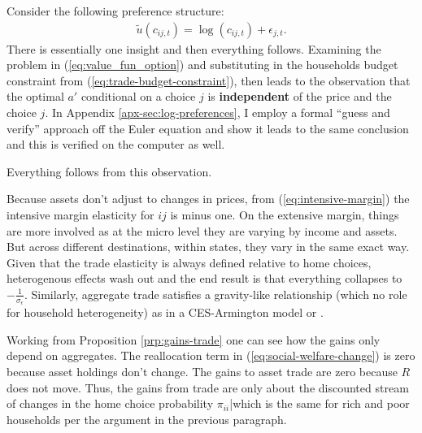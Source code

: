 \documentclass[12pt,pdftex]{article}
\begin{document}
\begin{onehalfspacing}
Consider the following preference structure:
\begin{align}
\tilde{u}( c_{ij,t} ) =  \log(c_{ij,t}) + \epsilon_{j,t}. \nonumber
\end{align}
There is essentially one insight and then everything follows. Examining the problem in (\ref{eq:value_fun_option}) and substituting in the households budget constraint from (\ref{eq:trade-budget-constraint}), then leads to the observation that the optimal $a'$ conditional on a choice $j$ is \textbf{independent} of the price and the choice $j$. In Appendix \ref{apx-sec:log-preferences}, I employ a formal ``guess and verify'' approach off the Euler equation and show it leads to the same conclusion and this is verified on the computer as well.

Everything follows from this observation.

Because assets don't adjust to changes in prices, from (\ref{eq:intensive-margin}) the intensive margin elasticity for $ij$ is minus one. On the extensive margin, things are more involved as at the micro level they are varying by income and assets. But across different destinations, within states, they vary in the same exact way. Given that the trade elasticity is always defined relative to home choices, heterogenous effects wash out and the end result is that everything collapses to $-\frac{1}{\sigma_{\epsilon}}$. Similarly, aggregate trade satisfies a gravity-like relationship (which no role for household heterogeneity) as in a CES-Armington model or \citet{eaton2002technology}.

Working from Proposition \ref{prp:gains-trade} one can see how the gains only depend on aggregates. The reallocation term in (\ref{eq:social-welfare-change}) is zero because asset holdings don't change. The gains to asset trade are zero because $R$ does not move. Thus, the gains from trade are only about the discounted stream of changes in the home choice probability $\pi_{ii}$|which is the same for rich and poor households per the argument in the previous paragraph.


\end{onehalfspacing}
\end{document}
